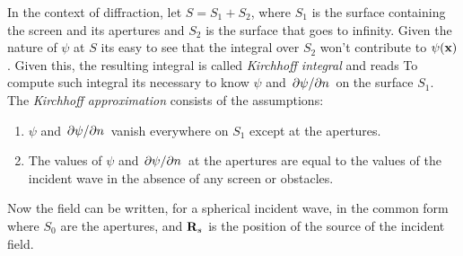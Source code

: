 \documentclass[oneside, 12pt, notitlepage]{book}
\begin{document}
In the context of diffraction, let \(S = S_1 + S_2\), where \(S_1\) is the surface containing the screen and its apertures and \(S_2\) is the surface that goes to infinity. Given the nature of \(\psi\) at \(S\) its easy to see that the integral over \(S_2\) won't contribute to \(\psi(\vb{x})\). Given this, the resulting integral is called \emph{Kirchhoff integral} and reads
To compute such integral its necessary to know \(\psi\) and \(\pdv*{\psi}{n}\) on the surface \(S_1\). The \emph{Kirchhoff approximation} consists of the assumptions:
\begin{enumerate}
	\item \(\psi\) and \(\pdv*{\psi}{n}\) vanish everywhere on \(S_1\) except at the apertures.
	\item The values of \(\psi\) and \(\pdv*{\psi}{n}\) at the apertures are equal to the values of the incident wave in the absence of any screen or obstacles.
\end{enumerate}\par
Now the field can be written, for a spherical incident wave, in the common form
where \(S_0\) are the apertures, and \(\vb{R}_s\) is the position of the source of the incident field.\par
\end{document}
